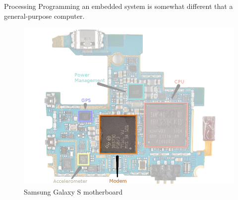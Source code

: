 \documentclass[aspectratio=169]{beamer}
\begin{document}
  
\begin{frame}[t]{Processing}
\small
Programming an embedded system is somewhat different that a general-purpose computer. \\
\vspace{1em}
\begin{figure}
\includegraphics[width=\textwidth,height=0.6\textheight,keepaspectratio,left]{img/Galaxy_Logic_Board_Edited_2_small_annotated_highlight_modem.png}
\captionsetup{justification=raggedright,singlelinecheck=false,labelformat=empty}
\caption{Samsung Galaxy S motherboard}
\end{figure}
\end{frame} 
\end{document}

